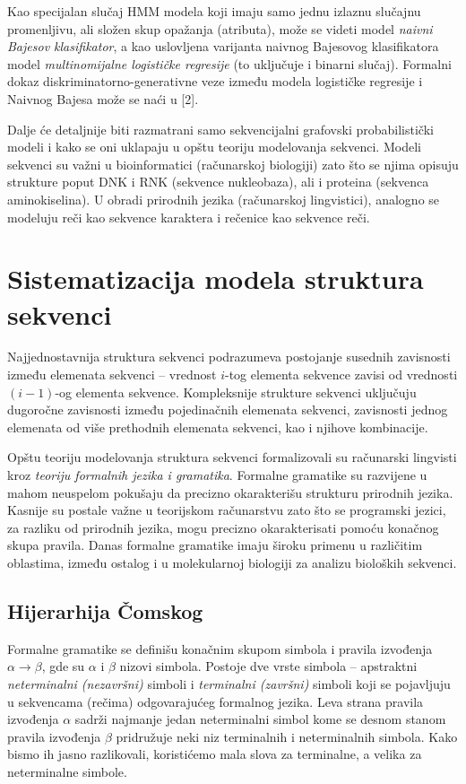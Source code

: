 \documentclass[a4paper, 12pt]{article}
\begin{document}
Kao specijalan slučaj HMM modela koji imaju samo jednu izlaznu slučajnu promenljivu, ali složen skup opažanja (atributa), može se videti model \textit{naivni Bajesov klasifikator}, a kao uslovljena varijanta naivnog Bajesovog klasifikatora model \textit{multinomijalne logističke regresije} (to uključuje i binarni slučaj). Formalni dokaz diskriminatorno-generativne veze između modela logističke regresije i Naivnog Bajesa može se naći u [2].

Dalje će detaljnije biti razmatrani samo sekvencijalni grafovski probabilistički modeli i kako se oni uklapaju u opštu teoriju modelovanja sekvenci. Modeli sekvenci su važni u bioinformatici (računarskoj biologiji) zato što se njima opisuju strukture poput DNK i RNK (sekvence nukleobaza), ali i proteina (sekvenca aminokiselina). U obradi prirodnih jezika (računarskoj lingvistici), analogno se modeluju reči kao sekvence karaktera i rečenice kao sekvence reči.

\section{Sistematizacija modela struktura sekvenci}

Najjednostavnija struktura sekvenci podrazumeva postojanje susednih zavisnosti između elemenata sekvenci -- vrednost $i$-tog elementa sekvence zavisi od vrednosti $(i-1)$-og elementa sekvence. Kompleksnije strukture sekvenci uključuju dugoročne zavisnosti između pojedinačnih elemenata sekvenci, zavisnosti jednog elemenata od više prethodnih elemenata sekvenci, kao i njihove kombinacije.

Opštu teoriju modelovanja struktura sekvenci formalizovali su računarski lingvisti kroz \textit{teoriju formalnih jezika i gramatika}.  Formalne gramatike su razvijene u mahom neuspelom pokušaju da precizno okarakterišu strukturu prirodnih jezika. Kasnije su postale važne u teorijskom računarstvu zato što se programski jezici, za razliku od prirodnih jezika, mogu precizno okarakterisati pomoću konačnog skupa pravila. Danas formalne gramatike imaju široku primenu u različitim oblastima, između ostalog i u molekularnoj biologiji za analizu bioloških sekvenci.

\subsection{Hijerarhija Čomskog}

Formalne gramatike se definišu konačnim skupom simbola i pravila izvođenja $\alpha \rightarrow \beta$, gde su $\alpha$ i $\beta$ nizovi simbola. Postoje dve vrste simbola -- apstraktni \textit{neterminalni (nezavršni)} simboli i \textit{terminalni (završni)} simboli koji se pojavljuju u sekvencama (rečima) odgovarajućeg formalnog jezika. Leva strana pravila izvođenja $\alpha$ sadrži najmanje jedan neterminalni simbol kome se desnom stanom pravila izvođenja $\beta$ pridružuje neki niz terminalnih i neterminalnih simbola. Kako bismo ih jasno razlikovali, koristićemo mala slova za terminalne, a velika za neterminalne simbole.
 
\end{document}
